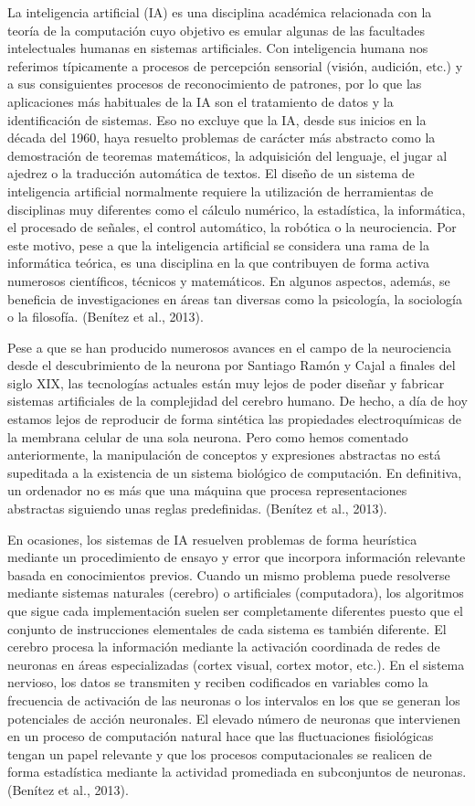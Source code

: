La inteligencia artificial (IA) es una disciplina académica relacionada con la teoría de la computación cuyo objetivo es emular algunas de las facultades intelectuales humanas en sistemas artificiales. Con inteligencia humana nos referimos típicamente a procesos de percepción sensorial (visión, audición, etc.) y a sus consiguientes procesos de reconocimiento de patrones, por lo que las aplicaciones más habituales de la IA son el tratamiento de datos y la identificación de sistemas. Eso no excluye que la IA, desde sus inicios en la década del 1960, haya resuelto problemas de carácter más abstracto como la demostración de teoremas matemáticos, la adquisición del lenguaje, el jugar al ajedrez o la traducción automática de textos. El diseño de un sistema de inteligencia artificial normalmente requiere la utilización de herramientas de disciplinas muy diferentes como el cálculo numérico, la estadística, la informática, el procesado de señales, el control automático, la robótica o la neurociencia. Por este motivo, pese a que la inteligencia artificial se considera una rama de la informática teórica, es una disciplina en la que contribuyen de forma activa numerosos científicos, técnicos y matemáticos. En algunos aspectos, además, se beneficia de investigaciones en áreas tan diversas como la psicología, la sociología o la filosofía. (Benítez et al., 2013).

Pese a que se han producido numerosos avances en el campo de la neurociencia desde el descubrimiento de la neurona por Santiago Ramón y Cajal a finales del siglo XIX, las tecnologías actuales están muy lejos de poder diseñar y fabricar sistemas artificiales de la complejidad del cerebro humano. De hecho, a día de hoy estamos lejos de reproducir de forma sintética las propiedades electroquímicas de la membrana celular de una sola neurona. Pero como hemos comentado anteriormente, la manipulación de conceptos y expresiones abstractas no está supeditada a la existencia de un sistema biológico de computación. En definitiva, un ordenador no es más que una máquina que procesa representaciones abstractas siguiendo unas reglas predefinidas. (Benítez et al., 2013).

En ocasiones, los sistemas de IA resuelven problemas de forma heurística mediante un procedimiento de ensayo y error que incorpora información relevante basada en conocimientos previos. Cuando un mismo problema puede resolverse mediante sistemas naturales (cerebro) o artificiales (computadora), los algoritmos que sigue cada implementación suelen ser completamente diferentes puesto que el conjunto de instrucciones elementales de cada sistema es también diferente. El cerebro procesa la información mediante la activación coordinada de redes de neuronas en áreas especializadas (cortex visual, cortex motor, etc.). En el sistema nervioso, los datos se transmiten y reciben codificados en variables como la frecuencia de activación de las neuronas o los intervalos en los que se generan los potenciales de acción neuronales. El elevado número de neuronas que intervienen en un proceso de computación natural hace que las fluctuaciones fisiológicas tengan un papel relevante y que los procesos computacionales se realicen de forma estadística mediante la actividad promediada en subconjuntos de neuronas. (Benítez et al., 2013).

